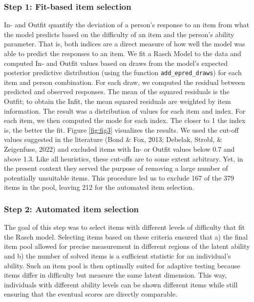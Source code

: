 \documentclass[
  man,floatsintext]{apa6}
\begin{document}
\hypertarget{step-1-fit-based-item-selection}{%
\subsubsection{Step 1: Fit-based item selection}\label{step-1-fit-based-item-selection}}

In- and Outfit quantify the deviation of a person's response to an item from what the model predicts based on the difficulty of an item and the person's ability parameter. That is, both indices are a direct measure of how well the model was able to predict the responses to an item. We fit a Rasch Model to the data and computed In- and Outfit values based on draws from the model's expected posterior predictive distribution (using the function \texttt{add\_epred\_draws}) for each item and person combination. For each draw, we computed the residual between predicted and observed responses. The mean of the squared residuals is the Outfit; to obtain the Infit, the mean squared residuals are weighted by item information. The result was a distribution of values for each item and index. For each item, we then computed the mode for each index. The closer to 1 the index is, the better the fit. Figure \ref{fig:fig3} visualizes the results. We used the cut-off values suggested in the literature (Bond \& Fox, 2013; Debelak, Strobl, \& Zeigenfuse, 2022) and excluded items with In- or Outfit values below 0.7 and above 1.3. Like all heuristics, these cut-offs are to some extent arbitrary. Yet, in the present context they served the purpose of removing a large number of potentially unsuitable items. This procedure led us to exclude 167 of the 379 items in the pool, leaving 212 for the automated item selection.

\hypertarget{step-2-automated-item-selection}{%
\subsubsection{Step 2: Automated item selection}\label{step-2-automated-item-selection}}

The goal of this step was to select items with different levels of difficulty that fit the Rasch model. Selecting items based on these criteria ensured that a) the final item pool allowed for precise measurement in different regions of the latent ability and b) the number of solved items is a sufficient statistic for an individual's ability. Such an item pool is then optimally suited for adaptive testing because items differ in difficulty but measure the same latent dimension. This way, individuals with different ability levels can be shown different items while still ensuring that the eventual scores are directly comparable.
\end{document}

